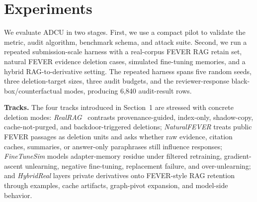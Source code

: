 \documentclass[10pt,journal,compsoc]{IEEEtran}
\newcommand{\method}{ADCU}
\begin{document}

\section{Experiments}

We evaluate \method{} in two stages. First, we use a compact pilot to validate the metric, audit algorithm, benchmark schema, and attack suite. Second, we run a repeated submission-scale harness with a real-corpus FEVER RAG retain set, natural FEVER evidence deletion cases, simulated fine-tuning memories, and a hybrid RAG-to-derivative setting. The repeated harness spans five random seeds, three deletion-target sizes, three audit budgets, and the reviewer-response black-box/counterfactual modes, producing 6,840 audit-result rows.

\textbf{Tracks.}
The four tracks introduced in Section~1 are stressed with concrete deletion modes: \emph{RealRAG}~\cite{thorne2018fever} contrasts provenance-guided, index-only, shadow-copy, cache-not-purged, and backdoor-triggered deletions; \emph{NaturalFEVER} treats public FEVER passages as deletion units and asks whether raw evidence, citation caches, summaries, or answer-only paraphrases still influence responses; \emph{FineTuneSim} models adapter-memory residue under filtered retraining, gradient-ascent unlearning, negative fine-tuning, replacement failure, and over-unlearning; and \emph{HybridReal} layers private derivatives onto FEVER-style RAG retention through examples, cache artifacts, graph-pivot expansion, and model-side behavior.
\end{document}
